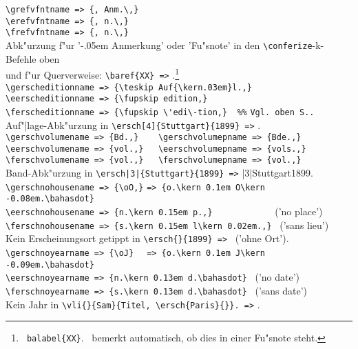 \documentclass[12pt,a4paper]{article}
\newcommand{\pbs}{\string\ \unskip}
\newcommand{\bs}{\protect\pbs}
\begin{document}
{\verb|\grefvfntname => {, Anm.\,}| \\[-.8ex]
\verb|\erefvfntname => {, n.\,}| \\[-.8ex]
\verb|\frefvfntname => {, n.\,}| \\[-.2ex]
Abk"urzung f"ur '\kern-.05em Anmerkung' oder 'Fu"snote' in den \verb|\conferize|-k-Befehle oben \\[-.5ex]
und f"ur \BibArts\hy Querverweise: \verb|\baref{XX} =>| .\footnote{
\texttt{\bs balabel\{XX\}}.
\BibArts\ bemerkt automatisch, ob dies in einer Fu"snote steht.}
\\[.8ex]%
\label{erscheditionname}%
\verb|\gerscheditionname => {\teskip Auf{\kern.03em}l.,}| \\[-.8ex]
\verb|\eerscheditionname => {\fupskip edition,}| \\[-.8ex]
\verb|\ferscheditionname => {\fupskip \'edi\-tion,}  %%| 
       \texttt{Vgl. oben S.\pageref{fordinalf}.} \\[-.2ex]
Auf"|lage-Abk"urzung in \verb|\ersch[4]{Stuttgart}{1899} =>| .
\\[.8ex]%
\verb|\gerschvolumename => {Bd.,}    \gerschvolumepname => {Bde.,}| \\[-.8ex]
\verb|\eerschvolumename => {vol.,}   \eerschvolumepname => {vols.,}| \\[-.8ex]
\verb|\ferschvolumename => {vol.,}   \ferschvolumepname => {vol.,}| \\[-.2ex]
Band-Abk"urzung in \verb+\ersch|3|{Stuttgart}{1899} =>+ \ersch|3|{Stuttgart}{1899}.
\\[.8ex]%
\verb|\gerschnohousename => {\oO,}| {\footnotesize\verb|=> {o.\kern 0.1em O\kern -0.08em.\bahasdot}|}\\[-.8ex]
\verb|\eerschnohousename => {n.\kern 0.15em p.,}            | ('no place') \\[-.8ex]
\verb|\ferschnohousename => {s.\kern 0.15em l\kern 0.02em.,}| \ ('sans lieu') \\[-.2ex]
Kein Erscheinungsort getippt in \verb|\ersch{}{1899} =>|  \ ('ohne Ort').
\\[.8ex]%
\verb|\gerschnoyearname => {\oJ}  | {\footnotesize\verb|=> {o.\kern 0.1em J\kern -0.09em.\bahasdot}|} \\[-.8ex] \label{gerschnoyearname}
\verb|\eerschnoyearname => {n.\kern 0.13em d.\bahasdot}| \ ('no date') \\[-.8ex]
\verb|\ferschnoyearname => {s.\kern 0.13em d.\bahasdot}| \ ('sans date') \\[-.2ex]
Kein Jahr in \verb|\vli{}{Sam}{Titel, \ersch{Paris}{}}. =>| 
{\notktitaddtok{}.}
}
\end{document}
